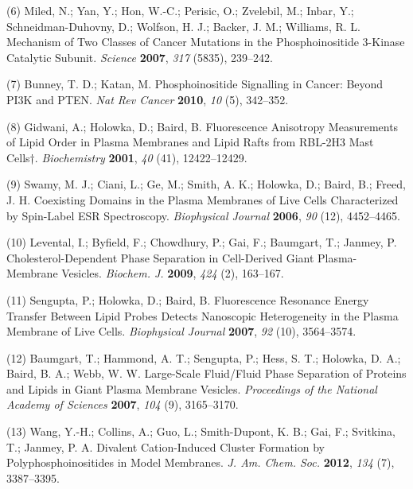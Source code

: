 \documentclass[11pt,notitlepage]{article}
\begin{document}
\leavevmode\hypertarget{ref-1HRoQaadQ}{}%
(6) Miled, N.; Yan, Y.; Hon, W.-C.; Perisic, O.; Zvelebil, M.; Inbar,
Y.; Schneidman-Duhovny, D.; Wolfson, H. J.; Backer, J. M.; Williams, R.
L. Mechanism of Two Classes of Cancer Mutations in the Phosphoinositide
3-Kinase Catalytic Subunit. \emph{Science} \textbf{2007}, \emph{317}
(5835), 239--242.

\leavevmode\hypertarget{ref-1DCzqvykg}{}%
(7) Bunney, T. D.; Katan, M. Phosphoinositide Signalling in Cancer:
Beyond PI3K and PTEN. \emph{Nat Rev Cancer} \textbf{2010}, \emph{10}
(5), 342--352.

\leavevmode\hypertarget{ref-GGtK2c0N}{}%
(8) Gidwani, A.; Holowka, D.; Baird, B. Fluorescence Anisotropy
Measurements of Lipid Order in Plasma Membranes and Lipid Rafts from
RBL-2H3 Mast Cells†. \emph{Biochemistry} \textbf{2001}, \emph{40} (41),
12422--12429.

\leavevmode\hypertarget{ref-1Eg1Hzju1}{}%
(9) Swamy, M. J.; Ciani, L.; Ge, M.; Smith, A. K.; Holowka, D.; Baird,
B.; Freed, J. H. Coexisting Domains in the Plasma Membranes of Live
Cells Characterized by Spin-Label ESR Spectroscopy. \emph{Biophysical
Journal} \textbf{2006}, \emph{90} (12), 4452--4465.

\leavevmode\hypertarget{ref-oBaB5Z87}{}%
(10) Levental, I.; Byfield, F.; Chowdhury, P.; Gai, F.; Baumgart, T.;
Janmey, P. Cholesterol-Dependent Phase Separation in Cell-Derived Giant
Plasma-Membrane Vesicles. \emph{Biochem. J.} \textbf{2009}, \emph{424}
(2), 163--167.

\leavevmode\hypertarget{ref-BzP79Vj9}{}%
(11) Sengupta, P.; Holowka, D.; Baird, B. Fluorescence Resonance Energy
Transfer Between Lipid Probes Detects Nanoscopic Heterogeneity in the
Plasma Membrane of Live Cells. \emph{Biophysical Journal} \textbf{2007},
\emph{92} (10), 3564--3574.

\leavevmode\hypertarget{ref-aiu6Tmil}{}%
(12) Baumgart, T.; Hammond, A. T.; Sengupta, P.; Hess, S. T.; Holowka,
D. A.; Baird, B. A.; Webb, W. W. Large-Scale Fluid/Fluid Phase
Separation of Proteins and Lipids in Giant Plasma Membrane Vesicles.
\emph{Proceedings of the National Academy of Sciences} \textbf{2007},
\emph{104} (9), 3165--3170.

\leavevmode\hypertarget{ref-LhOwGz4k}{}%
(13) Wang, Y.-H.; Collins, A.; Guo, L.; Smith-Dupont, K. B.; Gai, F.;
Svitkina, T.; Janmey, P. A. Divalent Cation-Induced Cluster Formation by
Polyphosphoinositides in Model Membranes. \emph{J. Am. Chem. Soc.}
\textbf{2012}, \emph{134} (7), 3387--3395.
\end{document}
